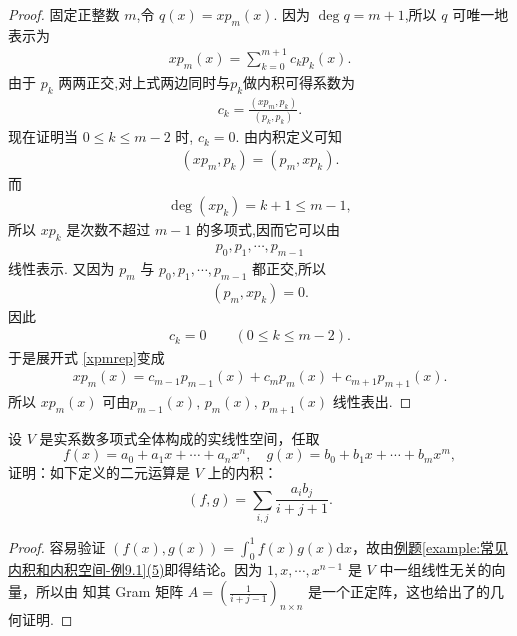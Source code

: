 \documentclass[../../main.tex]{subfiles}%
\begin{document}
\begin{proof}
固定正整数 \( m \),令
$q(x) = x p_m(x).$
因为 \( \deg q = m+1 \),所以 \( q \) 可唯一地表示为
\begin{align}
x p_m(x) = \sum\limits_{k=0}^{m+1} c_k p_k(x). \label{xpmrep}
\end{align}
由于 \( p_k \) 两两正交,对上式两边同时与$p_k$做内积可得系数为
\begin{align}
c_k = \frac{(x p_m, p_k)}{(p_k, p_k)}. \label{ckdef}
\end{align}
现在证明当 \( 0 \leqslant k \leqslant m-2 \) 时, \( c_k = 0 \). 由内积定义可知
\begin{align*}
(x p_m, p_k) = (p_m, x p_k).
\end{align*}
而
\begin{align*}
\deg(x p_k) = k+1 \leqslant m-1,
\end{align*}
所以 \( x p_k \) 是次数不超过 \( m-1 \) 的多项式,因而它可以由
\begin{align*}
p_0, p_1, \cdots, p_{m-1}
\end{align*}
线性表示. 又因为 \( p_m \) 与 \( p_0, p_1, \cdots, p_{m-1} \) 都正交,所以
\begin{align*}
(p_m, x p_k) = 0.
\end{align*}
因此
\begin{align*}
c_k = 0 \qquad (0 \leqslant k \leqslant m-2).
\end{align*}
于是展开式 \eqref{xpmrep}变成
\begin{align*}
x p_m(x) = c_{m-1} p_{m-1}(x) + c_m p_m(x) + c_{m+1} p_{m+1}(x).
\end{align*}
所以 \( x p_m(x) \) 可由$p_{m-1}(x),\, p_m(x),\, p_{m+1}(x)$
线性表出.
\end{proof}

\begin{proposition}
设 $V$ 是实系数多项式全体构成的实线性空间，任取
\[
f(x)=a_0 + a_1x + \cdots + a_nx^n,\quad g(x)=b_0 + b_1x + \cdots + b_mx^m,
\]
证明：如下定义的二元运算是 $V$ 上的内积：
\[
(f,g)=\sum_{i,j}\frac{a_ib_j}{i + j + 1}.
\]
\end{proposition}
\begin{proof}
容易验证 $(f(x),g(x)) = \int_{0}^{1}f(x)g(x)\mathrm{d}x$，故由\hyperref[example:常见内积和内积空间-例9.1]{例题\ref{example:常见内积和内积空间-例9.1}(5)}即得结论。因为 $1,x,\cdots,x^{n - 1}$ 是 $V$ 中一组线性无关的向量，所以由 知其 Gram 矩阵 $A = \left(\frac{1}{i + j - 1}\right)_{n\times n}$ 是一个正定阵，这也给出了的几何证明.
\end{proof}
\end{document}
